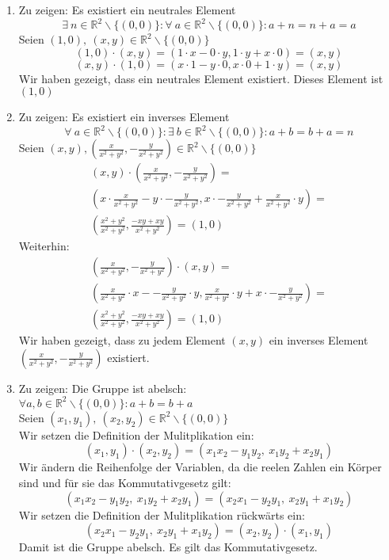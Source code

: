 \documentclass{article}
\begin{document}
\begin{enumerate}[ label = (\alph*) ]
        \item Zu zeigen: Es existiert ein neutrales Element
        \[ \exists \ n \in \mathbb{R}^2 \backslash \{(0, 0)\} : \forall \ a \in \mathbb{R}^2 \backslash \{(0, 0)\} : a + n = n + a = a \]
        Seien \( (1, 0), \ (x, y) \in \mathbb{R}^2 \backslash \{(0, 0)\} \) \\
        \[ (1, 0) \cdot (x, y) = (1 \cdot x - 0 \cdot y, 1 \cdot y + x \cdot 0) = (x , y) \]
        \[ (x, y) \cdot (1, 0) = (x \cdot 1 - y \cdot 0, x \cdot 0 + 1 \cdot y) = (x , y) \]
        Wir haben gezeigt, dass ein neutrales Element existiert. Dieses Element ist \( (1, 0) \)

        \item Zu zeigen: Es existiert ein inverses Element
        \[ \forall \ a \in \mathbb{R}^2 \backslash \{(0, 0)\}: \exists \ b \in \mathbb{R}^2 \backslash \{(0, 0)\}: a + b = b + a = n \]
        Seien \( (x, y), ( \frac{x}{ x^2 + y^2 }, - \frac{y}{ x^2 + y^2 } ) \in \mathbb{R}^2 \backslash \{(0, 0)\} \)
        \begin{gather*}
            (x, y) \cdot ( \frac{x}{ x^2 + y^2 }, - \frac{y}{ x^2 + y^2 } ) = \\
            ( x \cdot \frac{x}{ x^2 + y^2 } - y \cdot - \frac{y}{ x^2 + y^2 }, x \cdot - \frac{y}{ x^2 + y^2 } + \frac{x}{ x^2 + y^2 } \cdot y ) = \\
            ( \frac{ x^2 + y^2 }{ x^2 + y^2 }, \frac{ -xy + xy }{ x^2 + y^2} ) = (1, 0)
        \end{gather*}
        Weiterhin:
        \begin{gather*}
            ( \frac{x}{ x^2 + y^2 }, - \frac{y}{ x^2 + y^2 } ) \cdot (x, y) = \\
            ( \frac{x}{ x^2 + y^2 } \cdot x - - \frac{y}{ x^2 + y^2 } \cdot y, \frac{x}{ x^2 + y^2 } \cdot y + x \cdot - \frac{y}{ x^2 + y^2 } ) = \\
            ( \frac{ x^2 + y^2 }{ x^2 + y^2 }, \frac{ -xy + xy }{ x^2 + y^2} ) = (1, 0)
        \end{gather*}
        Wir haben gezeigt, dass zu jedem Element \((x , y)\) ein inverses Element \(( \frac{x}{ x^2 + y^2 }, - \frac{y}{ x^2 + y^2 } )\) existiert.

        \item Zu zeigen: Die Gruppe ist abelsch: \\
        \( \forall a, b \in \mathbb{R}^2 \backslash \{(0, 0)\}: a + b = b + a\) \\
        Seien \( (x_1, y_1), \ (x_2, y_2) \in \mathbb{R}^2 \backslash \{(0, 0)\} \) \\
        Wir setzen die Definition der Mulitplikation ein:
        \[ (x_1, y_1) \cdot (x_2, y_2)  = (x_1 x_2 - y_1 y_2, \ x_1 y_2 + x_2 y_1) \]
        Wir ändern die Reihenfolge der Variablen, da die reelen Zahlen ein Körper sind und für sie das Kommutativgesetz gilt:
        \[ (x_1 x_2 - y_1 y_2, \ x_1 y_2 + x_2 y_1) = (x_2 x_1 - y_2 y_1, \ x_2 y_1 + x_1 y_2) \]
        Wir setzen die Definition der Mulitplikation rückwärts ein:
        \[ (x_2 x_1 - y_2 y_1, \ x_2 y_1 + x_1 y_2) = (x_2, y_2) \cdot (x_1, y_1) \]
        Damit ist die Gruppe abelsch. Es gilt das Kommutativgesetz.


\end{enumerate}
\end{document}
